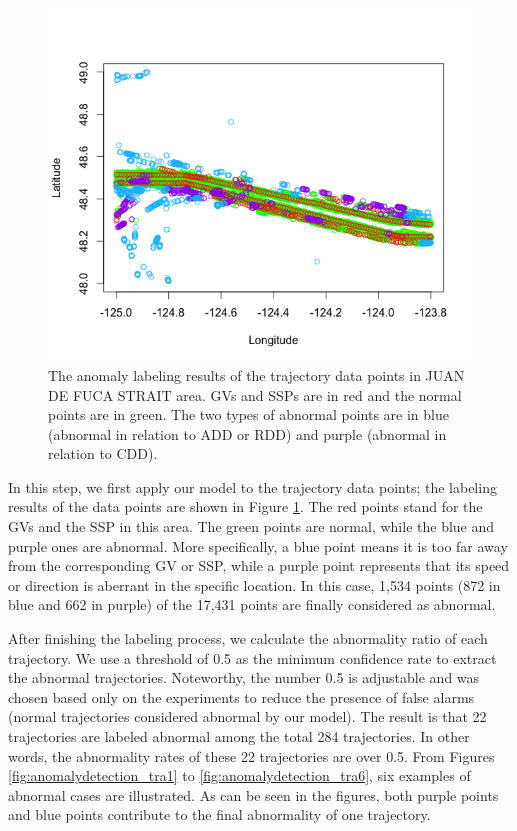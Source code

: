 \documentclass[12pt,glossary]{dalcsthesis}
\begin{document}
\begin{figure}[!htb]
\centering
\includegraphics[width=5in]{labelJDFK.png}
\caption{The anomaly labeling results of the trajectory data points in JUAN DE FUCA STRAIT area. GVs and SSPs are in red and the normal points are in green. The two types of abnormal points are in blue (abnormal in relation to ADD or RDD) and purple (abnormal in relation to CDD).}
\label{fig:anomalydetection_points}
\end{figure}

In this step, we first apply our model to the trajectory data points; the labeling results of the data points are shown in Figure \ref{fig:anomalydetection_points}. The red points stand for the GVs and the SSP in this area. The green points are normal, while the blue and purple ones are abnormal. More specifically, a blue point means it is too far away from the corresponding GV or SSP, while a purple point represents that its speed or direction is aberrant in the specific location.  In this case, 1,534 points (872 in blue and 662 in purple) of the 17,431 points are finally considered as abnormal. 

After finishing the labeling process, we calculate the abnormality ratio of each trajectory. We use a threshold of 0.5 as the minimum confidence rate to extract the abnormal trajectories. Noteworthy, the number 0.5 is adjustable and was chosen based only on the experiments to reduce the presence of false alarms (normal trajectories considered abnormal by our model). The result is that 22 trajectories are labeled abnormal among the total 284 trajectories. In other words, the abnormality rates of these 22 trajectories are over 0.5. From Figures \ref{fig:anomalydetection_tra1} to \ref{fig:anomalydetection_tra6}, six examples of abnormal cases are illustrated. As can be seen in the figures, both purple points and blue points contribute to the final abnormality of one trajectory.
\end{document}
